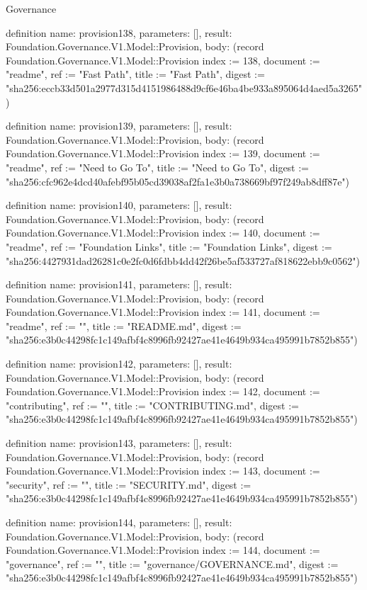 \begin{lexlean}{Governance}
\begin{semanticmodule}
definition{
  name: provision138,
  parameters: [],
  result: Foundation.Governance.V1.Model::Provision,
  body: (record Foundation.Governance.V1.Model::Provision {index := 138, document := "readme", ref := "Fast Path", title := "Fast Path", digest := "sha256:eccb33d501a2977d315d4151986488d9cf6e46ba4be933a895064d4aed5a3265"})
}

definition{
  name: provision139,
  parameters: [],
  result: Foundation.Governance.V1.Model::Provision,
  body: (record Foundation.Governance.V1.Model::Provision {index := 139, document := "readme", ref := "Need to Go To", title := "Need to Go To", digest := "sha256:cfc962e4dcd40afebf95b05cd39038af2fa1e3b0a738669bf97f249ab8dff87e"})
}

definition{
  name: provision140,
  parameters: [],
  result: Foundation.Governance.V1.Model::Provision,
  body: (record Foundation.Governance.V1.Model::Provision {index := 140, document := "readme", ref := "Foundation Links", title := "Foundation Links", digest := "sha256:4427931dad26281c0e2fc0d6fdbb4dd42f26be5af533727af818622ebb9c0562"})
}

definition{
  name: provision141,
  parameters: [],
  result: Foundation.Governance.V1.Model::Provision,
  body: (record Foundation.Governance.V1.Model::Provision {index := 141, document := "readme", ref := "", title := "README.md", digest := "sha256:e3b0c44298fc1c149afbf4c8996fb92427ae41e4649b934ca495991b7852b855"})
}

definition{
  name: provision142,
  parameters: [],
  result: Foundation.Governance.V1.Model::Provision,
  body: (record Foundation.Governance.V1.Model::Provision {index := 142, document := "contributing", ref := "", title := "CONTRIBUTING.md", digest := "sha256:e3b0c44298fc1c149afbf4c8996fb92427ae41e4649b934ca495991b7852b855"})
}

definition{
  name: provision143,
  parameters: [],
  result: Foundation.Governance.V1.Model::Provision,
  body: (record Foundation.Governance.V1.Model::Provision {index := 143, document := "security", ref := "", title := "SECURITY.md", digest := "sha256:e3b0c44298fc1c149afbf4c8996fb92427ae41e4649b934ca495991b7852b855"})
}

definition{
  name: provision144,
  parameters: [],
  result: Foundation.Governance.V1.Model::Provision,
  body: (record Foundation.Governance.V1.Model::Provision {index := 144, document := "governance", ref := "", title := "governance/GOVERNANCE.md", digest := "sha256:e3b0c44298fc1c149afbf4c8996fb92427ae41e4649b934ca495991b7852b855"})
}


\end{semanticmodule}
\end{lexlean}
